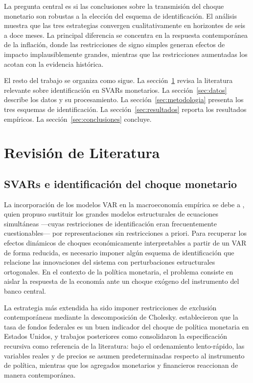 \documentclass[12pt,a4paper]{article}
\begin{document}
La pregunta central es si las conclusiones sobre la transmisión del choque monetario son
robustas a la elección del esquema de identificación.
El análisis muestra que las tres estrategias convergen cualitativamente en horizontes
de seis a doce meses.
La principal diferencia se concentra en la respuesta contemporánea de la inflación,
donde las restricciones de signo simples generan efectos de impacto implausiblemente
grandes, mientras que las restricciones aumentadas los acotan con la evidencia histórica.

El resto del trabajo se organiza como sigue.
La sección~\ref{sec:lit} revisa la literatura relevante sobre identificación en SVARs
monetarios.
La sección~\ref{sec:datos} describe los datos y su procesamiento.
La sección~\ref{sec:metodologia} presenta los tres esquemas de identificación.
La sección~\ref{sec:resultados} reporta los resultados empíricos.
La sección~\ref{sec:conclusiones} concluye.

\section{Revisión de Literatura}
\label{sec:lit}

\subsection{SVARs e identificación del choque monetario}

La incorporación de los modelos VAR en la macroeconomía
empírica se debe a \citet{sims1980}, quien propuso sustituir los grandes modelos
estructurales de ecuaciones simultáneas —cuyas restricciones de identificación eran
frecuentemente cuestionables— por representaciones sin restricciones a priori.
Para recuperar los efectos dinámicos de choques económicamente interpretables a partir de un VAR de forma reducida, es necesario imponer algún esquema de identificación que relacione las innovaciones del sistema con perturbaciones estructurales ortogonales.
En el contexto de la política monetaria, el problema consiste en aislar la respuesta de
la economía ante un choque exógeno del instrumento del banco central.

La estrategia más extendida ha sido imponer restricciones de exclusión contemporáneas
mediante la descomposición de Cholesky.
\citet{bernankeblinder1992} establecieron que la tasa de fondos federales es un buen
indicador del choque de política monetaria en Estados Unidos, y trabajos posteriores
como \citet{cee1999, cee2005} consolidaron la especificación recursiva como referencia
de la literatura: bajo el ordenamiento lento-rápido, las variables reales y de precios
se asumen predeterminadas respecto al instrumento de política, mientras que los
agregados monetarios y financieros reaccionan de manera contemporánea.
\end{document}
